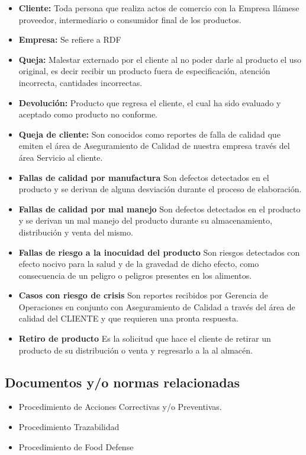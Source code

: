 \begin{itemize}
	\item \textbf{Cliente:} Toda persona que realiza actos de comercio con la Empresa llámese proveedor, intermediario o consumidor final de los productos.
	\item \textbf{Empresa:} Se refiere a \gls{RDF}
	\item \textbf{Queja:} Malestar externado por el cliente al no poder darle al producto el uso original, es decir recibir un producto fuera de especificación, atención incorrecta, cantidades incorrectas.
	\item \textbf{Devolución:} Producto que regresa el cliente, el cual ha sido evaluado y aceptado como producto no conforme.
	\item \textbf{Queja de cliente:} Son conocidos como reportes de falla de calidad que emiten el área de Aseguramiento de Calidad de nuestra empresa través del área Servicio al cliente.
	\item \textbf{Fallas de calidad por manufactura} Son defectos detectados en el producto y se derivan de alguna desviación durante el proceso de elaboración.
	\item \textbf{Fallas de calidad por mal manejo} Son defectos detectados en el producto y se derivan un mal manejo del producto durante su almacenamiento, distribución y venta del mismo.
	\item \textbf{Fallas de riesgo a la inocuidad del producto} Son riesgos detectados con efecto nocivo para la salud y de la gravedad de dicho efecto, como consecuencia de un peligro o peligros presentes en los alimentos.
	\item \textbf{Casos con riesgo de crisis} Son reportes recibidos por Gerencia de Operaciones en conjunto con Aseguramiento de Calidad a través del área de calidad del CLIENTE y que requieren una pronta respuesta.
	\item \textbf{Retiro de producto} Es la solicitud que hace el cliente de retirar un producto de su distribución o venta y regresarlo a la al almacén.
\end{itemize}

\subsection{Documentos y/o normas relacionadas}

\begin{itemize}
	\item Procedimiento de Acciones Correctivas y/o Preventivas.
	\item Procedimiento Trazabilidad
	\item Procedimiento de Food Defense
\end{itemize}

